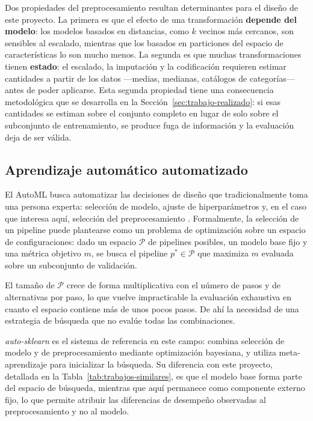 \documentclass[12pt,letterpaper,oneside]{article}
\begin{document}
Dos propiedades del preprocesamiento resultan determinantes para el diseño de este
proyecto. La primera es que el efecto de una transformación \textbf{depende del modelo}: los
modelos basados en distancias, como $k$ vecinos más cercanos, son sensibles al escalado,
mientras que los basados en particiones del espacio de características lo son mucho menos.
La segunda es que muchas transformaciones tienen \textbf{estado}: el escalado, la imputación y
la codificación requieren estimar cantidades a partir de los datos —medias, medianas,
catálogos de categorías— antes de poder aplicarse. Esta segunda propiedad tiene una
consecuencia metodológica que se desarrolla en la Sección~\ref{sec:trabajo-realizado}: si
esas cantidades se estiman sobre el conjunto completo en lugar de solo sobre el
subconjunto de entrenamiento, se produce fuga de información y la evaluación deja de ser
válida.

\subsection{Aprendizaje automático automatizado}

El AutoML busca automatizar las decisiones de diseño que tradicionalmente toma una
persona experta: selección de modelo, ajuste de hiperparámetros y, en el caso que
interesa aquí, selección del preprocesamiento \cite{hutter2019automl}. Formalmente, la
selección de un pipeline puede plantearse como un problema de optimización sobre un
espacio de configuraciones: dado un espacio $\mathcal{P}$ de pipelines posibles, un
modelo base fijo y una métrica objetivo $m$, se busca el pipeline $p^\ast \in \mathcal{P}$
que maximiza $m$ evaluada sobre un subconjunto de validación.

El tamaño de $\mathcal{P}$ crece de forma multiplicativa con el número de pasos y de
alternativas por paso, lo que vuelve impracticable la evaluación exhaustiva en cuanto el
espacio contiene más de unos pocos pasos. De ahí la necesidad de una estrategia de
búsqueda que no evalúe todas las combinaciones.

\textit{auto-sklearn} \cite{feurer2015autosklearn} es el sistema de referencia en este
campo: combina selección de modelo y de preprocesamiento mediante optimización bayesiana,
y utiliza meta-aprendizaje para inicializar la búsqueda. Su diferencia con este proyecto,
detallada en la Tabla~\ref{tab:trabajos-similares}, es que el modelo base forma parte del
espacio de búsqueda, mientras que aquí permanece como componente externo fijo, lo que
permite atribuir las diferencias de desempeño observadas al preprocesamiento y no al
modelo.
\end{document}
